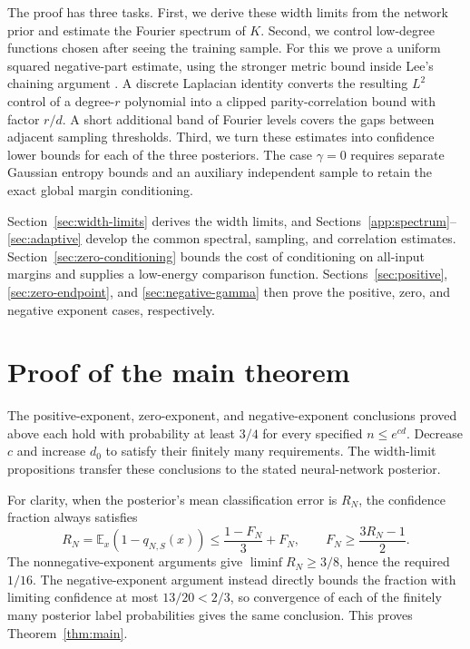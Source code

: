 \documentclass[11pt]{article}
\theoremstyle{remark}\newtheorem{remark}[theorem]{Remark}
\begin{document}
The proof has three tasks. First, we derive these width limits from
the network prior and estimate the Fourier spectrum of $K$. Second, we
control low-degree functions chosen after seeing the training sample.
For this we prove a uniform squared negative-part estimate, using the
stronger metric bound inside Lee's chaining argument \cite{Lee2023}.
A discrete Laplacian identity converts the resulting $L^2$ control of a
degree-$r$ polynomial into a clipped parity-correlation bound with factor
$r/d$. A short additional band of Fourier levels covers the gaps between
adjacent sampling thresholds. Third, we turn these estimates into
confidence lower bounds for each of the three posteriors. The case
$\gamma=0$ requires separate Gaussian entropy bounds and an auxiliary
independent sample to retain the exact global margin conditioning.

Section~\ref{sec:width-limits} derives the width limits, and
Sections~\ref{app:spectrum}--\ref{sec:adaptive} develop the common
spectral, sampling, and correlation estimates.
Section~\ref{sec:zero-conditioning} bounds the cost of conditioning on
all-input margins and supplies a low-energy comparison function.
Sections~\ref{sec:positive}, \ref{sec:zero-endpoint}, and
\ref{sec:negative-gamma} then prove the positive, zero, and negative
exponent cases, respectively.











\section{Proof of the main theorem}
The positive-exponent, zero-exponent, and negative-exponent conclusions
proved above each hold with probability at least $3/4$ for every specified
$n\le e^{cd}$. Decrease $c$ and increase $d_0$ to satisfy their finitely
many requirements. The width-limit propositions transfer these conclusions
to the stated neural-network posterior.

For clarity, when the posterior's mean classification error is $R_N$,
the confidence fraction always satisfies
\[
 R_N=\mathbb E_x(1-q_{N,S}(x))
 \le\frac{1-F_N}{3}+F_N,
 \qquad F_N\ge\frac{3R_N-1}{2}.
\]
The nonnegative-exponent arguments give $\liminf R_N\ge3/8$, hence the
required $1/16$. The negative-exponent argument instead directly bounds
the fraction with limiting confidence at most $13/20<2/3$, so convergence
of each of the finitely many posterior label probabilities gives the same
conclusion. This proves Theorem~\ref{thm:main}.
\end{document}
